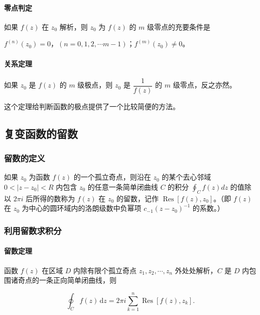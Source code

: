 \paragraph{零点判定}
\label{零点判定}
如果 \(f(z)\) 在 \(z_{0}\) 解析，则 \(z_{0}\) 为 \(f(z)\) 的 \(m\)
级零点的充要条件是

\(f^{(n)}(z_{0})=0\)，\((n=0,1,2,\cdots m-1)\)；\(f^{(m)}(z_{0})\neq 0\)。
\paragraph{关系定理}
\label{关系定理}
如果 \(z_0\) 是 \(f(z)\) 的 \(m\) 级极点，则 \(z_0\) 是
\(\dfrac{1}{f(z)}\) 的 \(m\) 级零点，反之亦然。

\begin{tcolorbox}[title={Info},colback=red!5!white
,colframe=red!75!black
,colbacktitle=yellow!50!red
,coltitle=red!25!black, fonttitle=\bfseries,subtitle style={boxrule=0.4pt, colback=yellow!50!red!25!white}]
这个定理给判断函数的极点提供了一个比较简便的方法。

\end{tcolorbox}
\subsection{复变函数的留数}
\label{复变函数的留数}
\subsubsection{留数的定义}
\label{留数的定义}
如果 \(z_{0}\) 为函数 \(f(z)\) 的一个孤立奇点，则沿在 \(z_{0}\)
的某个去心邻域 \(0<|z-z_{0}|<R\) 内包含 \(z_{0}\) 的任意一条简单闭曲线
\(C\) 的积分 \(\oint_{C} f(z)dz\) 的值除以 \(2\pi i\) 后所得的数称为
\(f(z)\) 在 \(z_{0}\) 的留数，记作
\(\operatorname{Res}[f(z),z_{0}]\)。（即 \(f(z)\) 在 \(z_{0}\)
为中心的圆环域内的洛朗级数中负幂项 \(c_{-1}(z-z_{0})^{-1}\) 的系数。）
\subsubsection{利用留数求积分}
\label{利用留数求积分}
\paragraph{留数定理}
\label{留数定理}
函数 \(f(z)\) 在区域 \(D\) 内除有限个孤立奇点
\(z_{1},z_{2},\cdots ,z_{n}\) 外处处解析，\(C\) 是 \(D\)
内包围诸奇点的一条正向简单闭曲线，则

\[
\oint_{C} f(z) \,\mathrm{d}z=2\pi i \sum_{k=1}^{n} \operatorname{Res}\left[f(z), z_k\right].
\]

